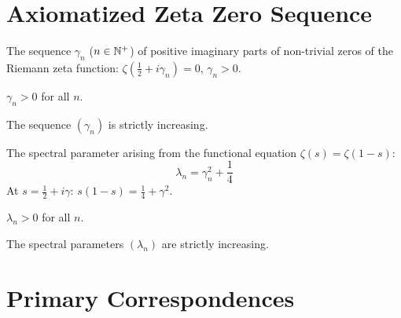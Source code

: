 \section{Axiomatized Zeta Zero Sequence}

\begin{definition}\label{def:gamma}
    The sequence $\gamma_n$ ($n \in \mathbb{N}^+$) of positive imaginary parts of
    non-trivial zeros of the Riemann zeta function:
    $\zeta(\tfrac{1}{2} + i\gamma_n) = 0$, $\gamma_n > 0$.
\end{definition}

\begin{theorem}[Positivity]\label{thm:gamma_pos}
    $\gamma_n > 0$ for all $n$.
\end{theorem}

\begin{theorem}[Monotonicity]\label{thm:gamma_mono}
    The sequence $(\gamma_n)$ is strictly increasing.
\end{theorem}

\begin{definition}\label{def:lambda_zeta}
    \leanok
    The spectral parameter arising from the functional equation $\zeta(s) = \zeta(1-s)$:
    \[
        \lambda_n = \gamma_n^2 + \frac{1}{4}
    \]
    At $s = \tfrac{1}{2} + i\gamma$: $s(1-s) = \tfrac{1}{4} + \gamma^2$.
\end{definition}

\begin{theorem}\label{thm:lambda_zeta_pos}
    \leanok
    $\lambda_n > 0$ for all $n$.
\end{theorem}

\begin{theorem}\label{thm:lambda_zeta_mono}
    \leanok
    The spectral parameters $(\lambda_n)$ are strictly increasing.
\end{theorem}

\section{Primary Correspondences}

